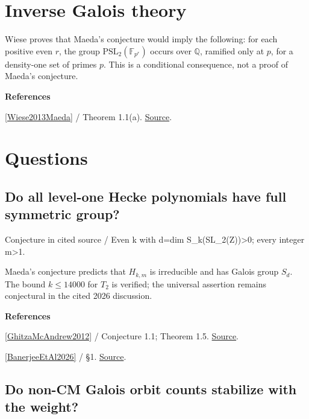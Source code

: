 \documentclass[11pt,a4paper,oneside,openany]{book}
\newenvironment{sources}{\par\smallskip\begingroup\footnotesize\color{atlasgray}\leftskip=10pt\setlength{\parskip}{2pt}}{\par\endgroup\smallskip}
\begin{document}
\section{Inverse Galois theory}
\color{black} Wiese proves that Maeda's conjecture would imply the following: for each positive even \(r\), the group \(\mathrm{PSL}_2(\mathbb F_{p^r})\) occurs over \(\mathbb Q\), ramified only at \(p\), for a density-one set of primes \(p\). This is a conditional consequence, not a proof of Maeda's conjecture.\par
\begin{sources}
\textbf{References}\par\smallskip
\noindent\hyperlink{ref:Wiese2013Maeda}{[Wiese2013Maeda]} / Theorem 1.1(a).  \href{https://arxiv.org/abs/1210.7157}{Source}.\par
\end{sources}\color{black}
\section*{Questions}
\subsection*{Do all level-one Hecke polynomials have full symmetric group?}
{\small\sffamily\color{atlasgold}Conjecture in cited source / Even k with d=dim S\_\allowbreak{}k(SL\_\allowbreak{}2(Z))>0; every integer m>1.}\par\smallskip
\color{black} Maeda's conjecture predicts that \(H_{k,m}\) is irreducible and has Galois group \(S_d\). The bound \(k\le14000\) for \(T_2\) is verified; the universal assertion remains conjectural in the cited 2026 discussion.\par
\begin{sources}
\textbf{References}\par\smallskip
\noindent\hyperlink{ref:GhitzaMcAndrew2012}{[GhitzaMcAndrew2012]} / Conjecture 1.1; Theorem 1.5.  \href{https://tcms.org.ge/Journals/ASETMJ/Volume5_2/Xpapers/tmj5_2_5.pdf}{Source}.\par
\noindent\hyperlink{ref:BanerjeeEtAl2026}{[BanerjeeEtAl2026]} / §1.  \href{https://arxiv.org/abs/2605.26771v2}{Source}.\par
\end{sources}\color{black}
\subsection*{Do non-CM Galois orbit counts stabilize with the weight?}
\end{document}
